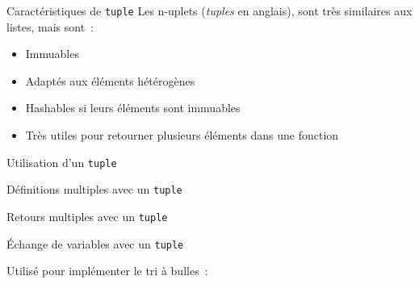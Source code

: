 \begin{frame}{Caractéristiques de \texttt{tuple}}
  Les n-uplets (\emph{tuples} en anglais), sont très similaires aux listes, mais sont~:

  \begin{itemize}
    \item Immuables
    \item Adaptés aux éléments hétérogènes
    \item Hashables si leurs éléments sont immuables
    \item Très utiles pour retourner plusieurs éléments dans une fonction
  \end{itemize}
\end{frame}

\begin{frame}{Utilisation d'un \texttt{tuple}}
\end{frame}

\begin{frame}{Définitions multiples avec un \texttt{tuple}}
\end{frame}

\begin{frame}{Retours multiples avec un \texttt{tuple}}
\end{frame}

\begin{frame}{Échange de variables avec un \texttt{tuple}}

  Utilisé pour implémenter le tri à bulles~:

\end{frame}
